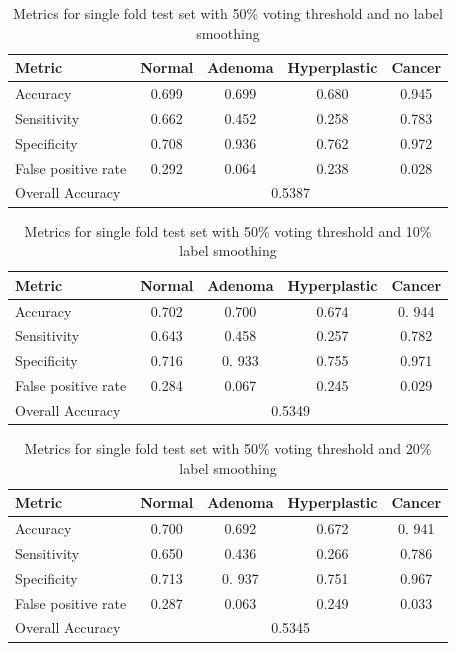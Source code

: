 \begin{table}[ht] \centering \caption{Metrics for single fold test set
with 50\% voting threshold and no label smoothing} \begin{tabular}{lcccc} \toprule Metric & Normal &
Adenoma & Hyperplastic & Cancer \\ \midrule Accuracy & 0.699 & 0.699 & 0.680 & 0.945
\\ Sensitivity & 0.662 & 0.452 & 0.258 & 0.783 \\ Specificity & 0.708 & 0.936 &
0.762 & 0.972 \\ False positive rate & 0.292 & 0.064 & 0.238 & 0.028 \\ \midrule
Overall Accuracy & \multicolumn{4}{c}{0.5387} \\ \bottomrule \end{tabular}
\label{tab:voting05_results} \end{table}

\begin{table}[ht] \centering \caption{Metrics for single fold test set with 50\% voting threshold and 10\% label smoothing} \begin{tabular}{lcccc} \toprule Metric & Normal
& Adenoma & Hyperplastic & Cancer \\ \midrule Accuracy & 0.702 & 0.700 & 0.674 & 0.
944 \\ Sensitivity & 0.643 & 0.458 & 0.257 & 0.782 \\ Specificity & 0.716 & 0.
933 & 0.755 & 0.971 \\ False positive rate & 0.284 & 0.067 & 0.245 & 0.029 \\
\midrule Overall Accuracy & \multicolumn{4}{c}{0.5349} \\ \bottomrule
\end{tabular} \label{tab:ls01_results} \end{table}

\begin{table}[ht] \centering \caption{Metrics for single fold test set with 50\% voting threshold and 20\% label smoothing} \begin{tabular}{lcccc} \toprule Metric & Normal
& Adenoma & Hyperplastic & Cancer \\ \midrule Accuracy & 0.700 & 0.692 & 0.672 & 0.
941 \\ Sensitivity & 0.650 & 0.436 & 0.266 & 0.786 \\ Specificity & 0.713 & 0.
937 & 0.751 & 0.967 \\ False positive rate & 0.287 & 0.063 & 0.249 & 0.033 \\
\midrule Overall Accuracy & \multicolumn{4}{c}{0.5345} \\ \bottomrule
\end{tabular} \label{tab:ls02_results} \end{table}


